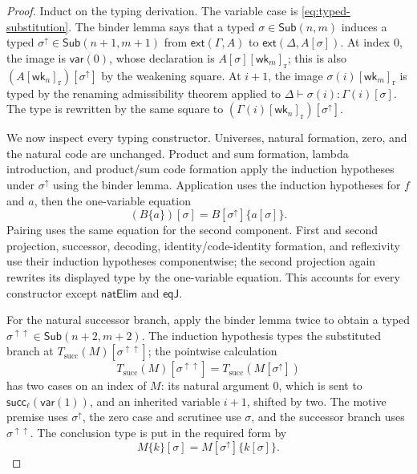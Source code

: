 \documentclass[10pt,reqno]{amsart}
\newcommand{\Ext}[2]{\mathsf{ext}(#1,#2)}
\newcommand{\Sub}{\mathsf{Sub}}
\newcommand{\Var}{\mathsf{var}}
\newcommand{\Succ}{\mathsf{succ}}
\newcommand{\NatElim}{\mathsf{natElim}}
\newcommand{\EqJ}{\mathsf{eqJ}}
\newcommand{\wk}{\mathsf{wk}}
\newcommand{\lift}{\uparrow}
\begin{document}
\begin{proof}
Induct on the typing derivation.  The variable case is
\eqref{eq:typed-substitution}.  The binder lemma says that a typed
\(\sigma\in\Sub(n,m)\) induces a typed
\(\sigma^\lift\in\Sub(n+1,m+1)\) from \(\Ext{\Gamma}{A}\) to
\(\Ext{\Delta}{A[\sigma]}\).  At index \(0\), the image is \(\Var(0)\), whose
declaration is \(A[\sigma][\wk_m]_{\mathrm r}\); this is also
\((A[\wk_n]_{\mathrm r})[\sigma^\lift]\) by the weakening square.  At
\(i+1\), the image \(\sigma(i)[\wk_m]_{\mathrm r}\) is typed by the renaming
admissibility theorem applied to
\(\Delta\vdash\sigma(i):\Gamma(i)[\sigma]\).  The type is rewritten by the
same square to
\((\Gamma(i)[\wk_n]_{\mathrm r})[\sigma^\lift]\).

We now inspect every typing constructor.  Universes, natural formation,
zero, and the natural code are unchanged.  Product and sum formation, lambda
introduction, and product/sum code formation apply the induction hypotheses
under \(\sigma^\lift\) using the binder lemma.  Application uses the
induction hypotheses for \(f\) and \(a\), then the one-variable equation
\[
 (B\{a\})[\sigma]=B[\sigma^\lift]\{a[\sigma]\}.
\]
Pairing uses the same equation for the second component.  First and second
projection, successor, decoding, identity/code-identity formation, and
reflexivity use their induction hypotheses componentwise; the second
projection again rewrites its displayed type by the one-variable equation.
This accounts for every constructor except \(\NatElim\) and \(\EqJ\).

For the natural successor branch, apply the binder lemma twice to
obtain a typed
\(\sigma^{\lift\lift}\in\Sub(n+2,m+2)\).  The induction hypothesis types the
substituted branch at
\(T_{\mathrm{succ}}(M)[\sigma^{\lift\lift}]\); the pointwise calculation
\[
 T_{\mathrm{succ}}(M)[\sigma^{\lift\lift}]
   =T_{\mathrm{succ}}(M[\sigma^\lift])
\tag{5.4}\label{eq:nat-target-substitution}
\]
has two cases on an index of \(M\): its natural argument \(0\), which is sent
to \(\Succ_\ell(\Var(1))\), and an inherited variable \(i+1\), shifted by
two.  The motive premise uses \(\sigma^\lift\), the zero case and scrutinee
use \(\sigma\), and the successor branch uses
\(\sigma^{\lift\lift}\).  The conclusion type is put in the required form by
\[
 M\{k\}[\sigma]=M[\sigma^\lift]\{k[\sigma]\}.
\]


\end{proof}
\end{document}
